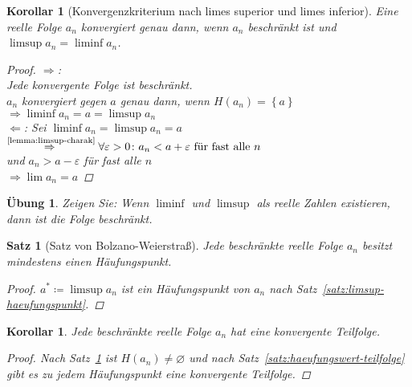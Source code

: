 \documentclass[11pt, twoside, a4paper]{article}
\theoremstyle{plain}
\newtheorem{satz}[blockelement]{Satz}
\newtheorem{korollar}[blockelement]{Korollar}
\newtheorem{uebung}[blockelement]{Übung}
\newcommand{\set}[1]{\left\{#1\right\}}
\newcommand{\impl}[0]{\Rightarrow{}}
\newcommand{\definedas}[0]{\coloneqq}
\renewcommand{\emptyset}{\varnothing}
\newcommand{\annot}[2]{\overset{\text{#2}}{#1}}
\newcommand{\anf}[1]{\glqq{}#1\grqq}
\begin{document}
    \begin{korollar}[Konvergenzkriterium nach limes superior und limes inferior]
        Eine reelle Folge $a_n$ konvergiert genau dann, wenn $a_n$ beschränkt ist und $\limsup a_n = \liminf a_n$.
        \begin{proof}
            \anf{$\impl$}:\\
            Jede konvergente Folge ist beschränkt.\\
            $a_n$ konvergiert gegen $a$ genau dann, wenn $H(a_n) = \set{a}$\\
            $\impl \liminf a_n = a = \limsup a_n$\\[10pt]
            \anf{$\Leftarrow$}: Sei $\liminf a_n = \limsup a_n = a$\\
            $\annot{\impl}{\ref{lemma:limsup-charak}} \forall \varepsilon > 0\colon a_n < a+\varepsilon \text{ für fast alle $n$}$\\
            und $a_n > a-\varepsilon $ für fast alle $n$\\
            $\impl \lim a_n = a$\qedhere
        \end{proof}
    \end{korollar}

    \begin{uebung}
        Zeigen Sie: Wenn $\liminf$ und $\limsup$ als reelle Zahlen existieren, dann ist die Folge beschränkt.
    \end{uebung}

    \begin{satz}[Satz von Bolzano-Weierstraß] %
        \label{satz:bolzano-weierstrass}
        Jede beschränkte reelle Folge $a_n$ besitzt mindestens einen Häufungspunkt.

        \begin{proof}
            $a^* \definedas \limsup a_n$ ist ein Häufungspunkt von $a_n$ nach Satz~\ref{satz:limsup-haeufungspunkt}.
        \end{proof}
    \end{satz}

    \begin{korollar}
        Jede beschränkte reelle Folge $a_n$ hat eine konvergente Teilfolge.
        \begin{proof}
            Nach Satz~\ref{satz:bolzano-weierstrass} ist $H(a_n) \neq\emptyset$ und nach Satz~\ref{satz:haeufungswert-teilfolge} gibt es zu jedem Häufungspunkt eine konvergente Teilfolge.
        \end{proof}
    \end{korollar}
\end{document}
